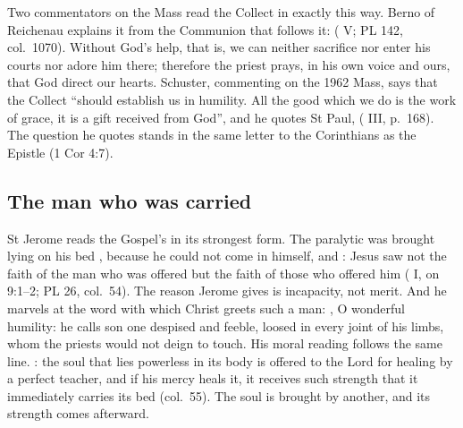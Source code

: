 Two commentators on the Mass read the Collect in exactly this way. Berno of
Reichenau explains it from the Communion that
follows it:  ( V; PL 142, col.~1070). Without
God's help, that is, we can neither sacrifice nor enter his courts nor adore
him there; therefore the priest prays, in his own voice and ours, that God
direct our hearts. Schuster, commenting on the 1962 Mass, says that the Collect
``should establish us in humility. All the good which we do is the work of
grace, it is a gift received from God'', and he quotes St Paul,  ( III,
p.~168). The question he quotes stands in the same letter to the Corinthians as
the Epistle (1 Cor 4:7).

\subsection{The man who was carried}

St Jerome reads the Gospel's  in its
strongest form. The paralytic was brought lying on his bed , because he could not come in himself, and : Jesus
saw not the faith of the man who was offered but the faith of those who offered
him ( I, on 9:1--2; PL 26, col.~54). The reason
Jerome gives is incapacity, not merit. And he marvels at the word with which
Christ greets such a man: , O wonderful humility: he calls son one despised and
feeble, loosed in every joint of his limbs, whom the priests would not deign to
touch. His moral reading follows the same line. : the soul that
lies powerless in its body is offered to the Lord for healing by a perfect
teacher, and if his mercy heals it, it receives such strength that it
immediately carries its bed (col.~55). The soul is brought by another, and its
strength comes afterward.

